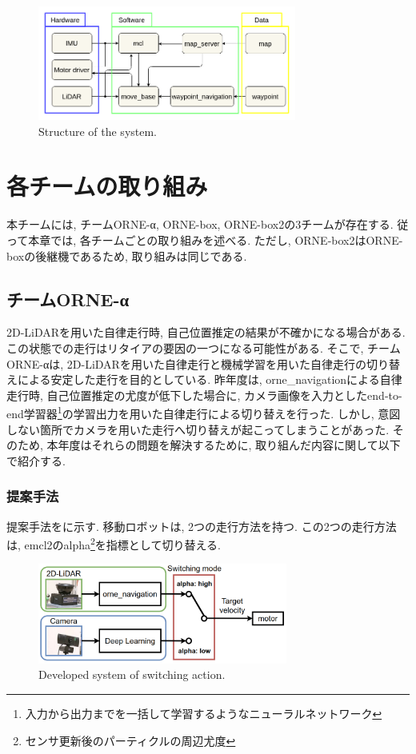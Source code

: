 \documentclass[uplatex, twocolumn, 9pt]{jsproceedings}
\begin{document}
\begin{figure}[h]
  \centering
  \includegraphics[width=85mm]{fig/software.pdf}
  \caption{Structure of the system.}
  \label{fig:soft-fig}%
\end{figure}

\section{各チームの取り組み}
本チームには, チームORNE-α, ORNE-box, ORNE-box2の3チームが存在する. 従って本章では, 各チームごとの取り組みを述べる. ただし, ORNE-box2はORNE-boxの後継機であるため, 取り組みは同じである.

\subsection{チームORNE-α}
2D-LiDARを用いた自律走行時, 自己位置推定の結果が不確かになる場合がある. この状態での走行はリタイアの要因の一つになる可能性がある. そこで, チームORNE-αは, 2D-LiDARを用いた自律走行と機械学習を用いた自律走行の切り替えによる安定した走行を目的としている. 昨年度は, orne\_navigationによる自律走行時, 自己位置推定の尤度が低下した場合に, カメラ画像を入力としたend-to-end学習器\footnote[1]{入力から出力までを一括して学習するようなニューラルネットワーク}\cite{end-to-end}の学習出力を用いた自律走行による切り替えを行った. しかし, 意図しない箇所でカメラを用いた走行へ切り替えが起こってしまうことがあった. そのため, 本年度はそれらの問題を解決するために, 取り組んだ内容に関して以下で紹介する. 

\subsubsection{提案手法}
提案手法をに示す. 移動ロボットは, 2つの走行方法を持つ. この2つの走行方法は, emcl2\cite{emcl2-git}のalpha\footnote[2]{センサ更新後のパーティクルの周辺尤度}を指標として切り替える.

\begin{figure}[h]
  \centering
  \includegraphics[width=82mm]{fig/switching.pdf}
  \caption{Developed system of switching action.}
  \label{fig:switching}%
\end{figure}
\end{document}
